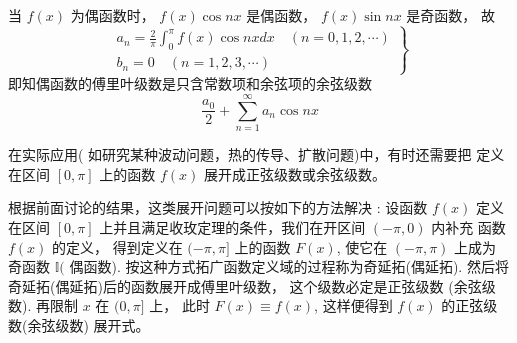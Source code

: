 \begin{definition}[余弦级数]
    当 $ f(x) $ 为偶函数时， $ f(x) \cos n x $ 是偶函数， $ f(x) \sin n x $ 是奇函数， 故
\begin{equation}
\left.\begin{array}{l}
a_{n}=\frac{2}{\pi} \int_{0}^{\pi} f(x) \cos n x {d} x \quad(n=0,1,2, \cdots) \\
b_{n}=0 \quad(n=1,2,3, \cdots)
\end{array}\right\}
\end{equation}
即知偶函数的傅里叶级数是只含常数项和余弦项的余弦级数
\begin{equation}
\frac{a_{0}}{2}+\sum_{n=1}^{\infty} a_{n} \cos n x
\end{equation}
\end{definition}

在实际应用( 如研究某种波动问题，热的传导、扩散问题)中，有时还需要把 定义在区间 $ [0, \pi] $ 上的函数 $ f(x) $ 展开成正弦级数或余弦级数。

根据前面讨论的结果，这类展开问题可以按如下的方法解决 : 设函数 $ f(x) $ 定义在区间 $ [0, \pi] $ 上并且满足收玫定理的条件，我们在开区间 $ (-\pi, 0) $ 内补充 函数 $ f(x) $ 的定义， 得到定义在 $ (-\pi, \pi] $ 上的函数 $ F(x) $, 使它在 $ (-\pi, \pi) $ 上成为 奇函数 $ \mathbb{I}( $ 偶函数). 按这种方式拓广函数定义域的过程称为奇延拓(偶延拓). 然后将奇延拓(偶延拓)后的函数展开成傅里叶级数， 这个级数必定是正弦级数 (余弦级数). 再限制 $ x $ 在 $ (0, \pi] $ 上， 此时 $ F(x) \equiv f(x) $, 这样便得到 $ f(x) $ 的正弦级 数(余弦级数) 展开式。


